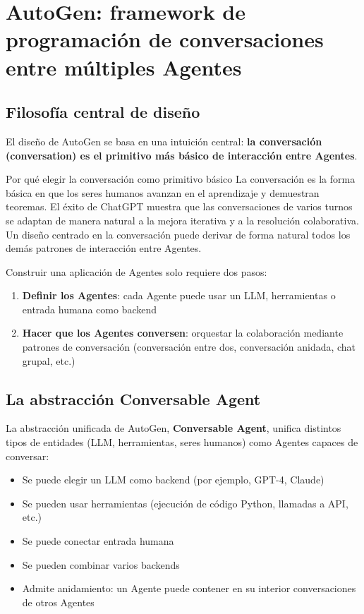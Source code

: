\section{AutoGen: framework de programación de conversaciones entre múltiples Agentes}

\subsection{Filosofía central de diseño}

El diseño de AutoGen se basa en una intuición central: \textbf{la conversación (conversation) es el primitivo más básico de interacción entre Agentes}.

\begin{knowledgebox}{Por qué elegir la conversación como primitivo básico}
La conversación es la forma básica en que los seres humanos avanzan en el aprendizaje y demuestran teoremas. El éxito de ChatGPT muestra que las conversaciones de varios turnos se adaptan de manera natural a la mejora iterativa y a la resolución colaborativa. Un diseño centrado en la conversación puede derivar de forma natural todos los demás patrones de interacción entre Agentes.
\end{knowledgebox}

Construir una aplicación de Agentes solo requiere dos pasos:
\begin{enumerate}
    \item \textbf{Definir los Agentes}: cada Agente puede usar un LLM, herramientas o entrada humana como backend
    \item \textbf{Hacer que los Agentes conversen}: orquestar la colaboración mediante patrones de conversación (conversación entre dos, conversación anidada, chat grupal, etc.)
\end{enumerate}

\subsection{La abstracción Conversable Agent}

La abstracción unificada de AutoGen, \textbf{Conversable Agent}, unifica distintos tipos de entidades (LLM, herramientas, seres humanos) como Agentes capaces de conversar:
\begin{itemize}
    \item Se puede elegir un LLM como backend (por ejemplo, GPT-4, Claude)
    \item Se pueden usar herramientas (ejecución de código Python, llamadas a API, etc.)
    \item Se puede conectar entrada humana
    \item Se pueden combinar varios backends
    \item Admite anidamiento: un Agente puede contener en su interior conversaciones de otros Agentes
\end{itemize}

